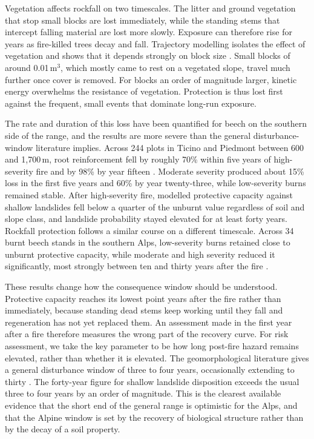 \documentclass[11pt,a4paper]{article}
\begin{document}
Vegetation affects rockfall on two timescales. The litter and ground vegetation that stop small blocks are lost immediately, while the standing stems that intercept falling material are lost more slowly. Exposure can therefore rise for years as fire-killed trees decay and fall. Trajectory modelling isolates the effect of vegetation and shows that it depends strongly on block size \citep{asteriou_assessing_2025}. Small blocks of around 0.01\,m$^3$, which mostly came to rest on a vegetated slope, travel much further once cover is removed. For blocks an order of magnitude larger, kinetic energy overwhelms the resistance of vegetation. Protection is thus lost first against the frequent, small events that dominate long-run exposure.

The rate and duration of this loss have been quantified for beech on the southern side of the range, and the results are more severe than the general disturbance-window literature implies. Across 244 plots in Ticino and Piedmont between 600 and 1{,}700\,m, root reinforcement fell by roughly 70\% within five years of high-severity fire and by 98\% by year fifteen \citep{gehring_shallow_2019}. Moderate severity produced about 15\% loss in the first five years and 60\% by year twenty-three, while low-severity burns remained stable. After high-severity fire, modelled protective capacity against shallow landslides fell below a quarter of the unburnt value regardless of soil and slope class, and landslide probability stayed elevated for at least forty years. Rockfall protection follows a similar course on a different timescale. Across 34 burnt beech stands in the southern Alps, low-severity burns retained close to unburnt protective capacity, while moderate and high severity reduced it significantly, most strongly between ten and thirty years after the fire \citep{maringer_temporal_2016}.

These results change how the consequence window should be understood. Protective capacity reaches its lowest point years after the fire rather than immediately, because standing dead stems keep working until they fall and regeneration has not yet replaced them. An assessment made in the first year after a fire therefore measures the wrong part of the recovery curve. For risk assessment, we take the key parameter to be how long post-fire hazard remains elevated, rather than whether it is elevated. The geomorphological literature gives a general disturbance window of three to four years, occasionally extending to thirty \citep{santi_wildfire_2022}. The forty-year figure for shallow landslide disposition exceeds the usual three to four years by an order of magnitude. This is the clearest available evidence that the short end of the general range is optimistic for the Alps, and that the Alpine window is set by the recovery of biological structure rather than by the decay of a soil property.
\end{document}
